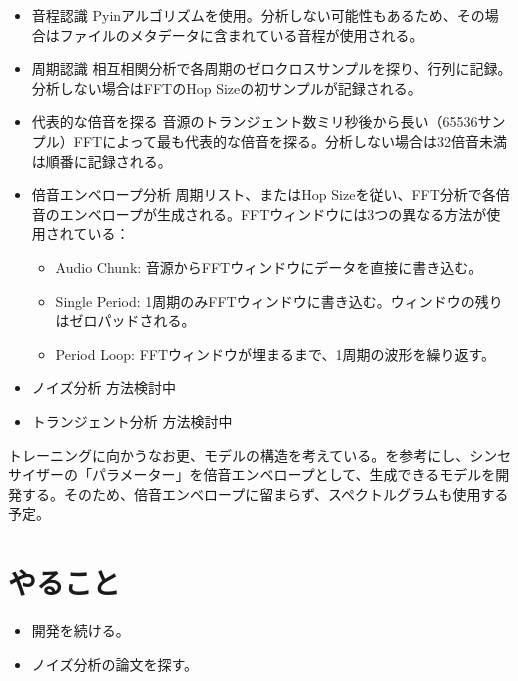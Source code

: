 \documentclass[a4paper, 11pt]{article}
\begin{document}
\begin{itemize}
    \item 音程認識 \newline Pyinアルゴリズムを使用。分析しない可能性もあるため、その場合はファイルのメタデータに含まれている音程が使用される。
    \item 周期認識 \newline 相互相関分析で各周期のゼロクロスサンプルを探り、行列に記録。分析しない場合はFFTのHop Sizeの初サンプルが記録される。
    \item 代表的な倍音を探る \newline 音源のトランジェント数ミリ秒後から長い（65536サンプル）FFTによって最も代表的な倍音を探る。分析しない場合は32倍音未満は順番に記録される。
    \item 倍音エンベロープ分析 \newline 周期リスト、またはHop Sizeを従い、FFT分析で各倍音のエンベロープが生成される。FFTウィンドウには3つの異なる方法が使用されている：
    \begin{itemize}
        \item Audio Chunk: 音源からFFTウィンドウにデータを直接に書き込む。
        \item Single Period: 1周期のみFFTウィンドウに書き込む。ウィンドウの残りはゼロパッドされる。
        \item Period Loop: FFTウィンドウが埋まるまで、1周期の波形を繰り返す。
    \end{itemize}
    \item ノイズ分析 \newline 方法検討中
    \item トランジェント分析 \newline 方法検討中
\end{itemize}

トレーニングに向かうなお更、モデルの構造を考えている。\cite{latentSpaceInterpolation}を参考にし、シンセサイザーの「パラメーター」を倍音エンベロープとして、生成できるモデルを開発する。そのため、倍音エンベロープに留まらず、スペクトルグラムも使用する予定。


\section*{やること}
\begin{itemize}
    \item 開発を続ける。
    \item ノイズ分析の論文を探す。
\end{itemize}



\end{document}
